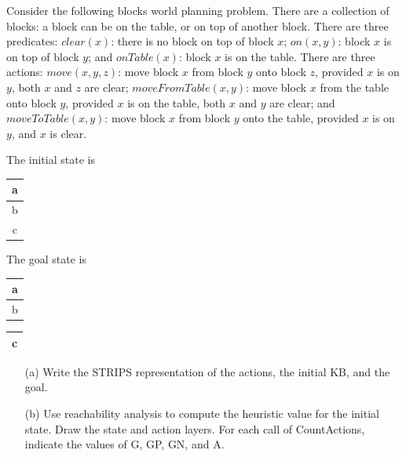 \documentclass[a4paper, 11pt]{article}
\begin{document}
\begin{question}\normalfont
Consider the following blocks world planning problem.
There are a collection of blocks: a block can be on the table, or on top of another block.
There are three predicates:
$clear(x)$: there is no block on top of block $x$;
$on(x, y)$: block $x$ is on top of block $y$; and
$onTable(x)$: block $x$ is on the table.
There are three actions:
$move(x, y, z)$: move block $x$ from block $y$ onto block $z$, provided $x$ is on $y$, both $x$ and $z$ are clear;
$moveFromTable(x, y)$: move block $x$ from the table onto block $y$, provided $x$ is on the table, both $x$ and $y$ are clear; and
$moveToTable(x, y)$: move block $x$ from block $y$ onto the table, provided $x$ is on $y$, and $x$ is clear.

The initial state is
\begin{tabular}{|c|}\hline
a\\\hline b\\\hline c\\\hline
\end{tabular}
\qquad The goal state is
\begin{tabular}{|c|}\hline
a\\\hline b\\\hline
\end{tabular}
\quad
\begin{tabular}{|c|}\hline
c\\\hline
\end{tabular}
\begin{itemize}
    \item [(a)] Write the STRIPS representation of the actions, the initial KB, and the goal.
    \item [(b)] Use reachability analysis to compute the heuristic value for the initial state. Draw the state and action layers. For each call of CountActions, indicate the values of G, GP, GN, and A.
\end{itemize}
\end{question}
\end{document}
